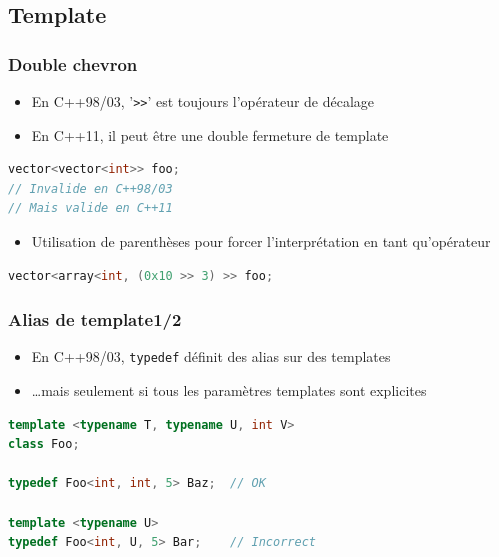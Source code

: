 \documentclass[C++.tex]{subfiles}
\begin{document}
\subsection*{Template}
\begin{frame}[fragile]
	\frametitle{Double chevron}
	\begin{itemize}
		\item En C++98/03, '\lstinline|>>|' est toujours l'opérateur de décalage
		\item En C++11, il peut être une double fermeture de template
	\end{itemize}

	\begin{lstlisting}[language=C++]
vector<vector<int>> foo;
// Invalide en C++98/03
// Mais valide en C++11\end{lstlisting}


	\begin{itemize}
		\item Utilisation de parenthèses pour forcer l'interprétation en tant qu'opérateur
	\end{itemize}

	\begin{lstlisting}[language=C++]
vector<array<int, (0x10 >> 3) >> foo;\end{lstlisting}
\end{frame}

\begin{frame}[fragile]
	\frametitle{Alias de template\titlehfill{}1/2}
	\begin{itemize}
		\item En C++98/03, \lstinline|typedef| définit des alias sur des templates
		\item \ldots mais seulement si tous les paramètres templates sont explicites
	\end{itemize}

	\begin{lstlisting}[language=C++]
template <typename T, typename U, int V>
class Foo;

typedef Foo<int, int, 5> Baz;  // OK

template <typename U>
typedef Foo<int, U, 5> Bar;    // Incorrect\end{lstlisting}
\end{frame}
\end{document}
